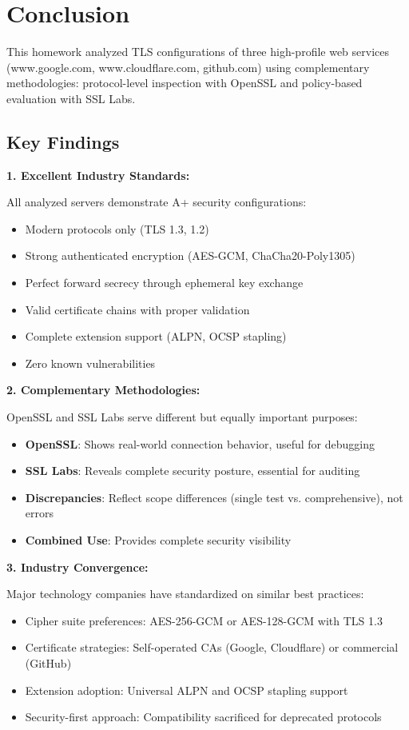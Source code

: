 \documentclass[12pt,a4paper]{article}
\begin{document}
\section{Conclusion}

This homework analyzed TLS configurations of three high-profile web services (www.google.com, www.cloudflare.com, github.com) using complementary methodologies: protocol-level inspection with OpenSSL and policy-based evaluation with SSL Labs.

\subsection{Key Findings}

\textbf{1. Excellent Industry Standards:}

All analyzed servers demonstrate A+ security configurations:
\begin{itemize}
    \item Modern protocols only (TLS 1.3, 1.2)
    \item Strong authenticated encryption (AES-GCM, ChaCha20-Poly1305)
    \item Perfect forward secrecy through ephemeral key exchange
    \item Valid certificate chains with proper validation
    \item Complete extension support (ALPN, OCSP stapling)
    \item Zero known vulnerabilities
\end{itemize}

\textbf{2. Complementary Methodologies:}

OpenSSL and SSL Labs serve different but equally important purposes:
\begin{itemize}
    \item \textbf{OpenSSL}: Shows real-world connection behavior, useful for debugging
    \item \textbf{SSL Labs}: Reveals complete security posture, essential for auditing
    \item \textbf{Discrepancies}: Reflect scope differences (single test vs. comprehensive), not errors
    \item \textbf{Combined Use}: Provides complete security visibility
\end{itemize}

\textbf{3. Industry Convergence:}

Major technology companies have standardized on similar best practices:
\begin{itemize}
    \item Cipher suite preferences: AES-256-GCM or AES-128-GCM with TLS 1.3
    \item Certificate strategies: Self-operated CAs (Google, Cloudflare) or commercial (GitHub)
    \item Extension adoption: Universal ALPN and OCSP stapling support
    \item Security-first approach: Compatibility sacrificed for deprecated protocols
\end{itemize}
\end{document}
